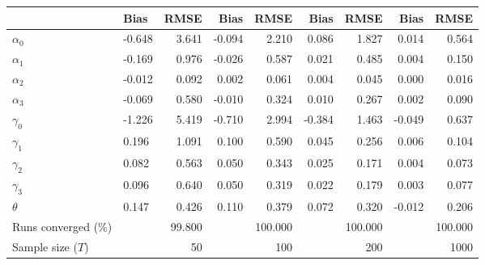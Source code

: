 
\begin{tabular}[t]{llrrrrrrr}
\toprule
  & Bias & RMSE & Bias & RMSE & Bias & RMSE & Bias & RMSE\\
\midrule
$\alpha_{0}$ & -0.648 & 3.641 & -0.094 & 2.210 & 0.086 & 1.827 & 0.014 & 0.564\\
$\alpha_{1}$ & -0.169 & 0.976 & -0.026 & 0.587 & 0.021 & 0.485 & 0.004 & 0.150\\
$\alpha_{2}$ & -0.012 & 0.092 & 0.002 & 0.061 & 0.004 & 0.045 & 0.000 & 0.016\\
$\alpha_{3}$ & -0.069 & 0.580 & -0.010 & 0.324 & 0.010 & 0.267 & 0.002 & 0.090\\
$\gamma_{0}$ & -1.226 & 5.419 & -0.710 & 2.994 & -0.384 & 1.463 & -0.049 & 0.637\\
$\gamma_{1}$ & 0.196 & 1.091 & 0.100 & 0.590 & 0.045 & 0.256 & 0.006 & 0.104\\
$\gamma_{2}$ & 0.082 & 0.563 & 0.050 & 0.343 & 0.025 & 0.171 & 0.004 & 0.073\\
$\gamma_{3}$ & 0.096 & 0.640 & 0.050 & 0.319 & 0.022 & 0.179 & 0.003 & 0.077\\
$\theta$ & 0.147 & 0.426 & 0.110 & 0.379 & 0.072 & 0.320 & -0.012 & 0.206\\
Runs converged (\%) &  & 99.800 &  & 100.000 &  & 100.000 &  & 100.000\\
Sample size ($T$) &  & 50 &  & 100 &  & 200 &  & 1000\\
\bottomrule
\end{tabular}
